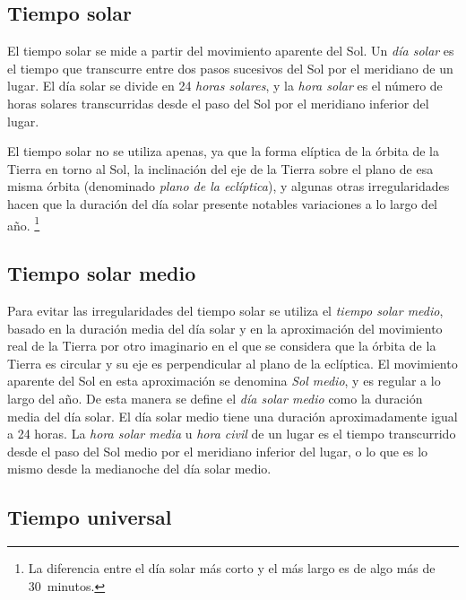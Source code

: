 \subsection{Tiempo solar}


El tiempo solar se mide a partir del movimiento aparente del Sol. Un \emph{día solar} es el tiempo que transcurre entre dos pasos sucesivos del Sol por el meridiano de un lugar. El día solar se divide en 24 \emph{horas solares}, y la \emph{hora solar} es el número de horas solares transcurridas desde el paso del Sol por el meridiano inferior del lugar. 

El tiempo solar no se utiliza apenas, ya que la forma elíptica de la órbita de la Tierra en torno al Sol, la inclinación del eje de la Tierra sobre el plano de esa misma órbita (denominado \emph{plano de la eclíptica}), y algunas otras irregularidades hacen que la duración del día solar presente notables variaciones a lo largo del año.%
\footnote{La diferencia entre el día solar más corto y el más largo es de algo más de 30~minutos.}

\subsection{Tiempo solar medio}


Para evitar las irregularidades del tiempo solar se utiliza el \emph{tiempo solar medio}, basado en la duración media del día solar y en la aproximación del movimiento real de la Tierra por otro imaginario en el que se considera que la órbita de la Tierra es circular y su eje es perpendicular al plano de la eclíptica. El movimiento aparente del Sol en esta aproximación se denomina \emph{Sol medio}, y es regular a lo largo del año. De esta manera se define el \emph{día 
solar medio} como la duración media del día solar. El día solar medio tiene una duración aproximadamente igual a 24 horas. La \emph{hora solar media} u \emph{hora civil} de un lugar es el tiempo transcurrido desde el paso del Sol medio por el meridiano inferior del lugar, o lo que es lo mismo desde la medianoche del día solar medio. 

\subsection{Tiempo universal}

